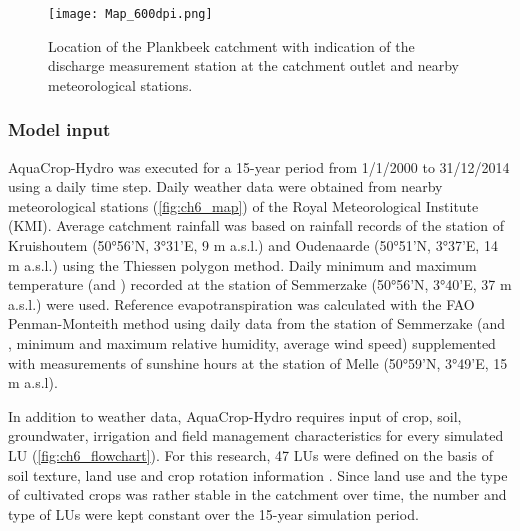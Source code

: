  \begin{figure}[tbhp]
	\centering
		\texttt{[image: Map\_600dpi.png]}
	\caption{Location of the Plankbeek catchment with indication of the discharge measurement station at the catchment outlet and nearby meteorological stations.}
	\label{fig:ch6_map}
\end{figure}

\subsubsection{Model input}
AquaCrop-Hydro was executed for a 15-year period from 1/1/2000 to 31/12/2014 using a daily time step. Daily weather data were obtained from nearby meteorological stations (\autoref{fig:ch6_map}) of the Royal Meteorological Institute (KMI). Average catchment rainfall was based on rainfall records of the station of Kruishoutem (50°56'N, 3°31'E, 9 m a.s.l.) and Oudenaarde (50°51'N, 3°37'E, 14 m a.s.l.) using the Thiessen polygon method. Daily minimum and maximum temperature (\Tmin and \Tmax) recorded at the station of Semmerzake (50°56'N, 3°40'E, 37 m a.s.l.) were used. Reference evapotranspiration was calculated with the FAO Penman-Monteith method using daily data from the station of Semmerzake (\Tmin and \Tmax, minimum and maximum relative humidity, average wind speed) supplemented with measurements of sunshine hours at the station of Melle (50°59'N, 3°49'E, 15 m a.s.l). 

In addition to weather data, AquaCrop-Hydro requires input of crop, soil, groundwater, irrigation and field management characteristics for every simulated LU (\autoref{fig:ch6_flowchart}). For this research, 47 LUs were defined on the basis of soil texture, land use and crop rotation information \parencite{agiv2014,agiv2001,dov2014,vlm2014}. Since land use and the type of cultivated crops was rather stable in the catchment over time, the number and type of LUs were kept constant over the 15-year simulation period. 

